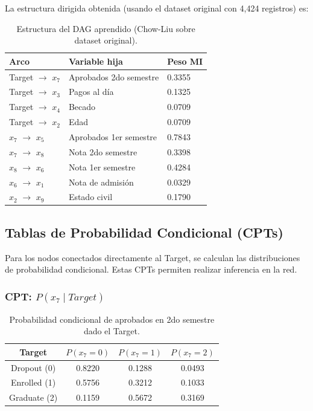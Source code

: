 \documentclass[12pt,a4paper]{article}
\begin{document}
La estructura dirigida obtenida (usando el dataset original con 4,424 registros) es:

\begin{table}[H]
    \centering
    \begin{tabular}{lll}
        \toprule
        \textbf{Arco} & \textbf{Variable hija} & \textbf{Peso MI} \\
        \midrule
        Target $\rightarrow$ $x_7$ & Aprobados 2do semestre & 0.3355 \\
        Target $\rightarrow$ $x_3$ & Pagos al día & 0.1325 \\
        Target $\rightarrow$ $x_4$ & Becado & 0.0709 \\
        Target $\rightarrow$ $x_2$ & Edad & 0.0709 \\
        $x_7$ $\rightarrow$ $x_5$ & Aprobados 1er semestre & 0.7843 \\
        $x_7$ $\rightarrow$ $x_8$ & Nota 2do semestre & 0.3398 \\
        $x_8$ $\rightarrow$ $x_6$ & Nota 1er semestre & 0.4284 \\
        $x_6$ $\rightarrow$ $x_1$ & Nota de admisión & 0.0329 \\
        $x_2$ $\rightarrow$ $x_9$ & Estado civil & 0.1790 \\
        \bottomrule
    \end{tabular}
    \caption{Estructura del DAG aprendido (Chow-Liu sobre dataset original).}
\end{table}

\subsection{Tablas de Probabilidad Condicional (CPTs)}

Para los nodos conectados directamente al Target, se calculan las distribuciones de probabilidad condicional. Estas CPTs permiten realizar inferencia en la red.

\subsubsection{CPT: $P(x_7 \mid Target)$}

\begin{table}[H]
    \centering
    \begin{tabular}{c|ccc}
        \toprule
        \textbf{Target} & $P(x_7=0)$ & $P(x_7=1)$ & $P(x_7=2)$ \\
        \midrule
        Dropout (0) & 0.8220 & 0.1288 & 0.0493 \\
        Enrolled (1) & 0.5756 & 0.3212 & 0.1033 \\
        Graduate (2) & 0.1159 & 0.5672 & 0.3169 \\
        \bottomrule
    \end{tabular}
    \caption{Probabilidad condicional de aprobados en 2do semestre dado el Target.}
\end{table}
\end{document}
